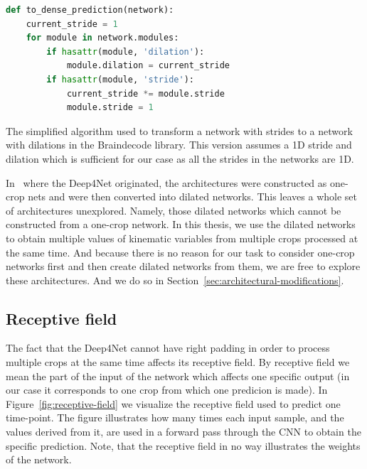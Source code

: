 \begin{algorithm}
\begin{lstlisting}[language=Python,label={lst:lstlisting}]
def to_dense_prediction(network):
	current_stride = 1
	for module in network.modules:
		if hasattr(module, 'dilation'):
			module.dilation = current_stride
		if hasattr(module, 'stride'):
			current_stride *= module.stride
			module.stride = 1
\end{lstlisting}
\caption{The simplified algorithm used to transform a network with strides to a network with dilations in the Braindecode library.
This version assumes a 1D stride and dilation which is sufficient for our case as all the strides in the networks are 1D.
}
\label{alg:stride-to-dilation}
\end{algorithm}


In~\cite{schirrmeister-deep-2017} where the Deep4Net originated, the architectures were constructed as one-crop nets and were then converted into dilated networks.
This leaves a whole set of architectures unexplored.
Namely, those dilated networks which cannot be constructed from a one-crop network.
In this thesis, we use the dilated networks to obtain multiple values of kinematic variables from multiple crops processed at the same time. 
And because there is no reason for our task to consider one-crop networks first and then create dilated networks from them, we are free to explore these architectures.
And we do so in Section~\ref{sec:architectural-modifications}.

\subsection{Receptive field}\label{subsec:receptive-field}
The fact that the Deep4Net cannot have right padding in order to process multiple crops at the same time affects its receptive field.
By receptive field we mean the part of the input of the network which affects one specific output (in our case it corresponds to one crop from which one predicion is made).
In Figure~\ref{fig:receptive-field} we visualize the receptive field used to predict one time-point.
The figure illustrates how many times each input sample, and the values derived from it, are used in a forward pass through the CNN to obtain the specific prediction.
Note, that the receptive field in no way illustrates the weights of the network.

